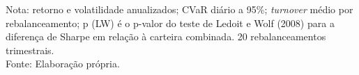 \begin{table}[htbp]
\vspace{0.2cm}
\small Nota: retorno e volatilidade anualizados; CVaR diário a 95\%; \textit{turnover} médio por rebalanceamento; p (LW) é o p-valor do teste de Ledoit e Wolf (2008) para a diferença de Sharpe em relação à carteira combinada. 20 rebalanceamentos trimestrais.\\
Fonte: Elaboração própria.
\end{table}
